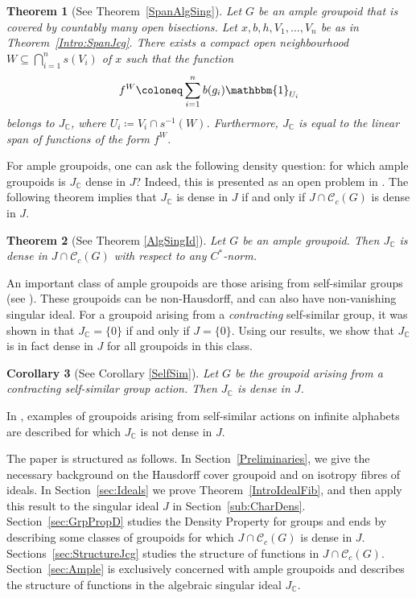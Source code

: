 \documentclass[11pt, oneside, reqno]{amsart}
\newcommand{\cg}{\mathscr{C}_c(G)}
\newcommand{\PRLsep}{\noindent\makebox[\linewidth]{\resizebox{0.3333\linewidth}{1pt}{$\bullet$}}\bigskip}
\newtheorem{introthm}{Theorem}
\newtheorem{introcor}[introthm]{Corollary}
\theoremstyle{definition}
\theoremstyle{remark}
\numberwithin{equation}{section}
\begin{document}
\begin{introthm}[See Theorem~\ref{SpanAlgSing}]\label{Intro:SpanAlgSing}
Let $G$ be an ample groupoid that is covered by countably many open bisections. Let $x, b, h, V_1, \dots, V_n$ be as in Theorem~\ref{Intro:SpanJcg}. There exists a compact open neighbourhood $W\subseteq \bigcap_{i=1}^n s(V_{i})$ of $x$ such that the function 
\begin{equation}
\label{eqn:AlgSingconstruction}
f^{W} \coloneq \sum_{i=1}^n b(g_i) \mathbbm{1}_{U_i}
\end{equation}
belongs to $J_\mathbb{C}$, where $U_i \coloneq V_i \cap s^{-1}(W)$. Furthermore, $J_{\mathbb{C}}$ is equal to the linear span of functions of the form $f^{W}$.
\end{introthm}


For ample groupoids, one can ask the following density question: for which ample groupoids is $J_\mathbb{C}$ dense in $J$? Indeed, this is presented as an open problem in \cite{GNSV}. The following theorem implies that $J_\mathbb{C}$ is dense in $J$ if and only if $J \cap \cg$ is dense in $J$.

\begin{introthm}[See Theorem \ref{AlgSingId}]
     Let $G$ be an ample groupoid. Then $J_{\mathbb{C}}$ is dense in $J \cap \cg$ with respect to any $C^*$-norm.
\end{introthm}


An important class of ample groupoids are those arising from self-similar groups (see \cite{Nek05}). These groupoids can be non-Hausdorff, and can also have non-vanishing singular ideal. For a groupoid arising from a \emph{contracting} self-similar group, it was shown in \cite{GNSV} that $J_\mathbb{C} = \{0\}$ if and only if $J = \{0\}$. Using our results, we show that $J_\mathbb{C}$ is in fact dense in $J$ for all groupoids in this class.

\begin{introcor}[See Corollary \ref{SelfSim}]\label{IntroSelfSim}
    Let $G$ be the groupoid arising from a contracting self-similar group action. Then $J_{\mathbb{C}}$ is dense in $J$.
\end{introcor}

In \cite{MS25}, examples of groupoids arising from self-similar actions on infinite alphabets are described for which $J_\mathbb{C}$ is not dense in $J$.

\PRLsep

The paper is structured as follows. In Section~\ref{Preliminaries}, we give the necessary background on the Hausdorff cover groupoid and on isotropy fibres of ideals. In Section~\ref{sec:Ideals} we prove Theorem~\ref{IntroIdealFib}, and then apply this result to the singular ideal $J$ in Section~\ref{sub:CharDens}. Section~\ref{sec:GrpPropD} studies the Density Property for groups and ends by describing some classes of groupoids for which $J \cap \cg$ is dense in $J$. Sections~\ref{sec:StructureJcg} studies the structure of functions in $J \cap \cg$. Section~\ref{sec:Ample} is exclusively concerned with ample groupoids and describes the structure of functions in the algebraic singular ideal $J_\mathbb{C}$.
\end{document}
